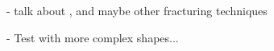 \documentclass[tog]{acmsiggraph}
\begin{document}
- talk about \cite{Parker:2009:RTD}, \cite{Rivers:2007:FFL} and maybe other fracturing techniques

- Test with more complex shapes... 






  
\end{document}

